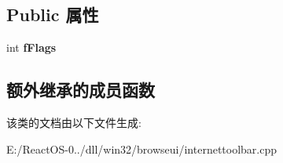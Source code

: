 \subsection*{Public 属性}
\begin{DoxyCompactItemize}
\item 
\mbox{\label{class_c_dock_site_a25ca3e7aca144979e2a738c8061fb806}} 
int {\bfseries f\+Flags}
\end{DoxyCompactItemize}
\subsection*{额外继承的成员函数}


该类的文档由以下文件生成\+:\begin{DoxyCompactItemize}
\item 
E\+:/\+React\+O\+S-\/0../dll/win32/browseui/internettoolbar.\+cpp\end{DoxyCompactItemize}
